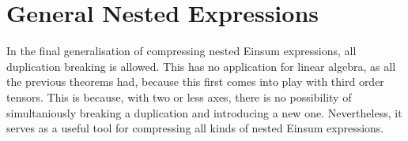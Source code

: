 \section{General Nested Expressions}

In the final generalisation of compressing nested Einsum expressions, all duplication breaking is allowed.
This has no application for linear algebra, as all the previous theorems had, because this first comes into play with third order tensors.
This is because, with two or less axes, there is no possibility of simultaniously breaking a duplication and introducing a new one.
Nevertheless, it serves as a useful tool for compressing all kinds of nested Einsum expressions.


